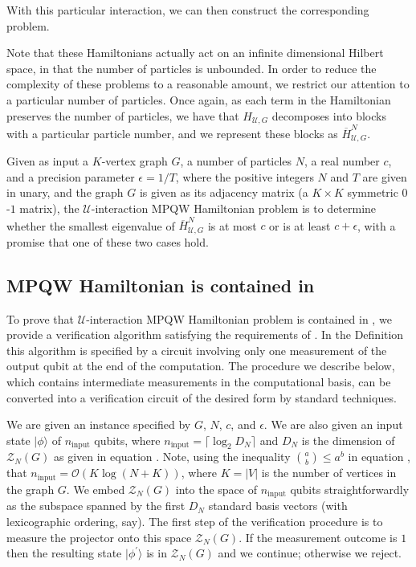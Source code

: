 \documentclass[../thesis-main/thesis-main]{subfiles}
\begin{document}
With this particular interaction, we can then construct the corresponding problem. 

Note that these Hamiltonians actually act on an infinite dimensional Hilbert space, in that the number of particles is unbounded.  In order to reduce the complexity of these problems to a reasonable amount, we restrict our attention to a particular number of particles.  Once again, as each term in the Hamiltonian preserves the number of particles, we have that $H_{\mathcal{U},G}$ decomposes into blocks with a particular particle number, and we represent these blocks as $\overline{H}_{\mathcal{U},G}^N$.  

\begin{problem}
  Given as input a $K$-vertex graph $G$, a number of particles $N$, a real number $c$, and a precision parameter $\epsilon = 1/T$, where the positive integers $N$ and $T$ are given in unary, and the graph $G$ is given as its adjacency matrix (a $K\times K$ symmetric $0$-$1$ matrix), the $\mathcal{U}$-interaction MPQW Hamiltonian problem is to determine whether the smallest eigenvalue of $\overline{H}_{\mathcal{U},G}^N$ is at most $c$ or is at least $c+\epsilon$, with a promise that one of these two cases hold.
\end{problem}


\subsection{MPQW Hamiltonian is contained in \QMA}
\label{sec:containment_in_QMA}

To prove that $\mathcal{U}$-interaction MPQW Hamiltonian problem is contained in \QMA, we provide a verification algorithm satisfying the requirements of . In the Definition this algorithm is specified by a circuit involving only one measurement of the output qubit at the end of the computation. The procedure we describe below, which contains intermediate measurements in the computational basis, can be converted into a verification circuit of the desired form by standard techniques.

We are given an instance specified by $G$, $N$, $c$, and $\epsilon$. We are also given an input state $|\phi\rangle$ of $n_{\text{input}}$ qubits, where $n_{\text{input}}=\lceil \log_{2}D_{N}\rceil $ and $D_{N}$ is the dimension of $\mathcal{Z}_{N}(G)$ as given in equation . Note, using the inequality $\binom{a}{b} \leq a^{b}$ in equation , that $n_{\text{input}}=\mathcal{O}(K\log\left(N+K\right))$, where $K=|V|$ is the number of vertices in the graph $G$. We embed $\mathcal{Z}_{N}(G)$ into the space of $n_{\text{input}}$ qubits straightforwardly as the subspace spanned by the first $D_{N}$ standard basis vectors (with lexicographic ordering, say). The first step of the verification procedure is to measure the projector onto this space $\mathcal{Z}_{N}(G)$. If the measurement outcome is $1$ then the resulting state $|\phi^{\prime}\rangle$ is in $\mathcal{Z}_{N}(G)$ and we continue; otherwise we reject.
\end{document}
